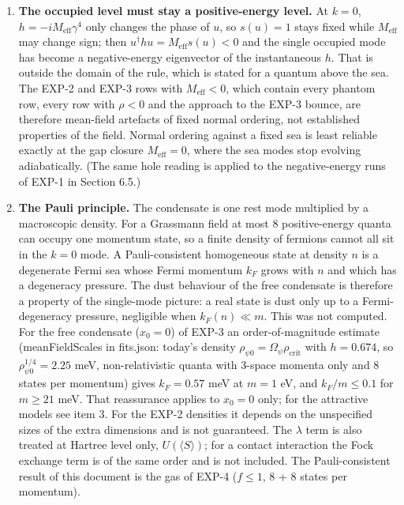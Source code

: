 \documentclass[11pt]{article}
\begin{document}
\begin{enumerate}
\item \textbf{The occupied level must stay a positive-energy level.} At $k=0$, $h=-iM_{\mathrm{eff}}\gamma^4$ only changes the phase of $u$, so $s(u)=1$ stays fixed while $M_{\mathrm{eff}}$ may change sign; then $u^\dagger hu=M_{\mathrm{eff}}s(u)<0$ and the single occupied mode has become a negative-energy eigenvector of the instantaneous $h$. That is outside the domain of the rule, which is stated for a quantum above the sea. The EXP-2 and EXP-3 rows with $M_{\mathrm{eff}}<0$, which contain every phantom row, every row with $\rho<0$ and the approach to the EXP-3 bounce, are therefore mean-field artefacts of fixed normal ordering, not established properties of the field. Normal ordering against a fixed sea is least reliable exactly at the gap closure $M_{\mathrm{eff}}=0$, where the sea modes stop evolving adiabatically. (The same hole reading is applied to the negative-energy runs of EXP-1 in Section 6.5.)
\item \textbf{The Pauli principle.} The condensate is one rest mode multiplied by a macroscopic density. For a Grassmann field at most 8 positive-energy quanta can occupy one momentum state, so a finite density of fermions cannot all sit in the $k=0$ mode. A Pauli-consistent homogeneous state at density $n$ is a degenerate Fermi sea whose Fermi momentum $k_F$ grows with $n$ and which has a degeneracy pressure. The dust behaviour of the free condensate is therefore a property of the single-mode picture: a real state is dust only up to a Fermi-degeneracy pressure, negligible when $k_F(n)\ll m$. This was not computed. For the free condensate ($x_0=0$) of EXP-3 an order-of-magnitude estimate (meanFieldScales in fits.json: today's density $\rho_{\psi0}=\Omega_\psi\rho_{\mathrm{crit}}$ with $h=0.674$, so $\rho_{\psi0}^{1/4}=2.25$ meV, non-relativistic quanta with 3-space momenta only and 8 states per momentum) gives $k_F=0.57$ meV at $m=1$ eV, and $k_F/m\le0.1$ for $m\ge21$ meV. That reassurance applies to $x_0=0$ only; for the attractive models see item 3. For the EXP-2 densities it depends on the unspecified sizes of the extra dimensions and is not guaranteed. The $\lambda$ term is also treated at Hartree level only, $U(\langle S\rangle)$; for a contact interaction the Fock exchange term is of the same order and is not included. The Pauli-consistent result of this document is the gas of EXP-4 ($f\le1$, 8 + 8 states per momentum).

\end{enumerate}
\end{document}
